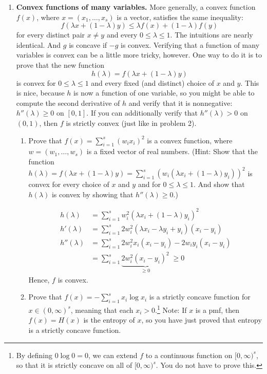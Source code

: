 \documentclass[12pt]{article}
\begin{document}
\begin{enumerate}[1.]
	      \pagebreak
	\item {\bf Convex functions of many variables.} More generally, a convex function $f(x)$, where $x=(x_1,\dotsc,x_s)$ is a vector, satisfies the same inequality: \[ f(\lambda x + (1-\lambda)y) \leq \lambda f(x)+(1-\lambda)f(y) \] for every distinct pair $x\neq y$ and every $0\leq \lambda\leq 1$. The intuitions are nearly identical. And $g$ is concave if $-g$ is convex. Verifying that a function of many variables is convex can be a little more tricky, however. One way to do it is to prove that the new function
	      \[ h(\lambda) = f(\lambda x + (1-\lambda) y) \]
	      is convex for $0\leq \lambda \leq 1$ and every fixed (and distinct) choice of $x$ and $y$. This is nice, because $h$ is now a function of one variable, so you might be able to compute the second derivative of $h$ and verify that it is nonnegative: $h''(\lambda)\geq 0$ on $[0,1]$. If you can additionally verify that $h''(\lambda)>0$ on $(0,1)$, then $f$ is strictly convex (just like in problem 2).
	      \begin{enumerate}
		      \item Prove that $f(x)=\sum_{i=1}^s (w_i x_i)^2$ is a convex function, where $w=(w_1,\dotsc,w_s)$ is a fixed vector of real numbers.  (Hint: Show that the function $h(\lambda)=f(\lambda x+(1-\lambda)y)=\sum_{i=1}^s (w_i(\lambda x_i +(1-\lambda) y_i))^2$ is convex for every choice of $x$ and $y$ and for $0\leq\lambda\leq 1$. And show that $h(\lambda)$ is convex by showing that $h''(\lambda)\geq 0$.)

		            \color{blue}
		            \begin{align*}
			            h(\lambda)   & =\sum_{i=1}^s w_i^2 (\lambda x_i +(1-\lambda) y_i)^2               \\
			            h'(\lambda)  & = \sum_{i=1}^s 2w_i^2(\lambda x_i - \lambda y_i + y_i) (x_i - y_i) \\
			            h''(\lambda) & = \sum_{i=1}^s 2w_i^2 x_i(x_i - y_i) - 2w_i y_i(x_i - y_i)         \\
			                         & = \sum_{i=1}^s \underbrace{2w_i^2(x_i - y_i)^2}_{\geq 0}\; \geq 0
		            \end{align*}
		            Hence, $f$ is convex.
		            \color{black}

		      \item Prove that $f(x) = -\sum_{i=1}^s x_i\log x_i$ is a strictly concave function for $x\in(0,\infty)^s$, meaning that each $x_i > 0$.\footnote{By defining $0\log 0=0$, we can extend $f$ to a continuous function on $[0,\infty)^s$, so that it is strictly concave on all of $[0,\infty)^s$. You do not have to prove this.} Note: If $x$ is a pmf, then $f(x)=H(x)$ is the entropy of $x$, so you have just proved that entropy is a strictly concave function.


\end{enumerate}
\end{enumerate}
\end{document}
